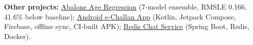   \vspace{-4pt}
  \small{\textbf{Other projects:}
  \href{https://github.com/srini2k03/abalone-age-regression}{\underline{Abalone Age Regression}} (7-model ensemble, RMSLE 0.166, 41.6\% below baseline);
  \href{https://github.com/srini2k03/traffic-violation-fine-manager}{\underline{Android e-Challan App}} (Kotlin, Jetpack Compose, Firebase, offline sync, CI-built APK);
  \href{https://github.com/srini2k03/Simple-Chat-Application-Using-Redis}{\underline{Redis Chat Service}} (Spring Boot, Redis, Docker).}
